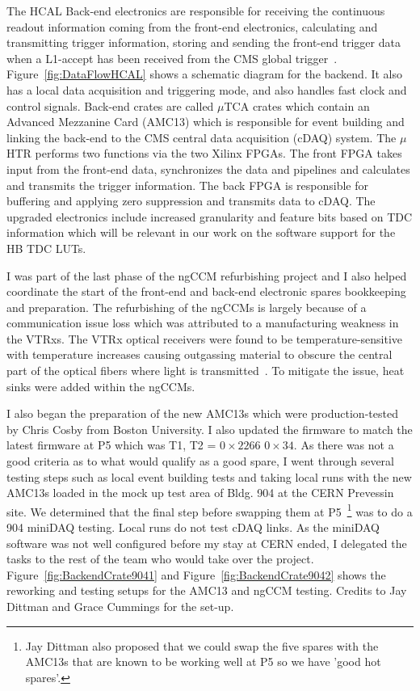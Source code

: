 The HCAL Back-end electronics are responsible for receiving the continuous readout information coming from the front-end electronics, calculating and transmitting trigger information, storing and sending the front-end trigger data when a L1-accept has been received from the CMS global trigger~\cite{Cooper:2016kef}. Figure~\ref{fig:DataFlowHCAL} shows a schematic diagram for the backend. It also has a local data acquisition and triggering mode, and also handles fast clock and control signals. Back-end crates are called $\mu$TCA crates which contain an Advanced Mezzanine Card (AMC13) which is responsible for event building and linking the back-end to the CMS central data acquisition (cDAQ) system. The $\mu$HTR performs two functions via the two Xilinx FPGAs. The front FPGA takes input from the front-end data, synchronizes the data and pipelines and calculates and transmits the trigger information. The back FPGA is responsible for buffering and applying zero suppression and transmits data to cDAQ. The upgraded electronics include increased granularity and feature bits based on TDC information which will be relevant in our work on the software support for the HB TDC LUTs. 

I was part of the last phase of the ngCCM refurbishing project and I also helped coordinate the start of the front-end and back-end electronic spares bookkeeping and preparation. The refurbishing of the ngCCMs is largely because of a communication issue loss which was attributed to a manufacturing weakness in the VTRxs. The VTRx optical receivers were found to be temperature-sensitive with temperature increases causing outgassing material to obscure the central part of the optical fibers where light is transmitted~\cite{Cummings:2022kgm}. To mitigate the issue, heat sinks were added within the ngCCMs. 

I also began the preparation of the new AMC13s which were production-tested by Chris Cosby from Boston University. I also updated the firmware to match the latest firmware at P5 which was T1, T2 = $0\times2266$ $0\times34$. As there was not a good criteria as to what would qualify as a good spare, I went through several testing steps such as local event building tests and taking local runs with the new AMC13s loaded in the mock up test area of Bldg. 904 at the CERN Prevessin site. We determined that the final step before swapping them at P5~\footnote{Jay Dittman also proposed that we could swap the five spares with the AMC13s that are known to be working well at P5 so we have 'good hot spares'.} was to do a 904 miniDAQ testing. Local runs do not test cDAQ links. As the miniDAQ software was not well configured before my stay at CERN ended, I delegated the tasks to the rest of the team who would take over the project. Figure~\ref{fig:BackendCrate9041} and Figure~\ref{fig:BackendCrate9042} shows the reworking and testing setups for the AMC13 and ngCCM testing. Credits to Jay Dittman and Grace Cummings for the set-up.

